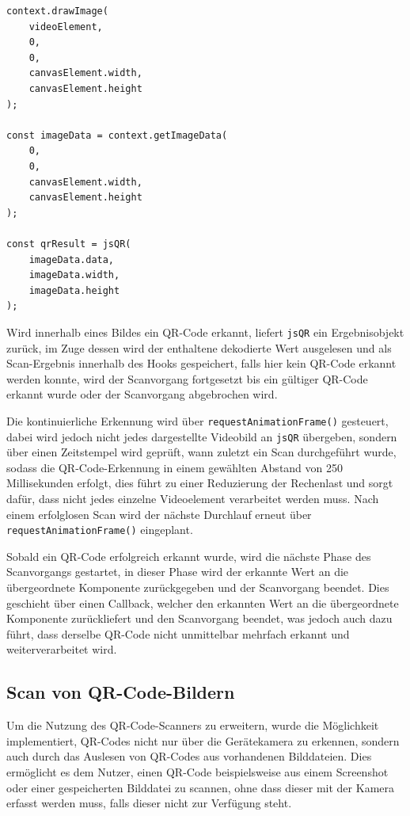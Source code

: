 ﻿\documentclass[oneside]{ausarbeitung}
\begin{document}
\begin{verbatim}
context.drawImage(
    videoElement,
    0,
    0,
    canvasElement.width,
    canvasElement.height
);

const imageData = context.getImageData(
    0,
    0,
    canvasElement.width,
    canvasElement.height
);

const qrResult = jsQR(
    imageData.data,
    imageData.width,
    imageData.height
);
\end{verbatim}


Wird innerhalb eines Bildes ein QR-Code erkannt, liefert \texttt{jsQR} ein Ergebnisobjekt zurück, im Zuge dessen wird der enthaltene dekodierte 
Wert ausgelesen und als Scan-Ergebnis innerhalb des Hooks gespeichert, falls hier kein QR-Code erkannt werden konnte, wird der Scanvorgang 
fortgesetzt bis ein gültiger QR-Code erkannt wurde oder der Scanvorgang abgebrochen wird.

Die kontinuierliche Erkennung wird über \texttt{requestAnimationFrame()} gesteuert, dabei wird jedoch nicht jedes dargestellte Videobild
an \texttt{jsQR} übergeben, sondern über einen Zeitstempel wird geprüft, wann zuletzt ein Scan durchgeführt wurde, sodass die QR-Code-Erkennung 
in einem gewählten Abstand von 250 Millisekunden erfolgt, dies führt zu einer Reduzierung der Rechenlast und sorgt dafür, dass nicht jedes einzelne
Videoelement verarbeitet werden muss. Nach einem erfolglosen Scan wird der nächste Durchlauf erneut über \texttt{requestAnimationFrame()} eingeplant.

Sobald ein QR-Code erfolgreich erkannt wurde, wird die nächste Phase des Scanvorgangs gestartet, in dieser Phase wird der erkannte Wert an die
übergeordnete Komponente zurückgegeben und der Scanvorgang beendet. Dies geschieht über einen Callback, welcher den erkannten Wert an die
übergeordnete Komponente zurückliefert und den Scanvorgang beendet, was jedoch auch dazu führt, dass derselbe QR-Code nicht unmittelbar mehrfach
erkannt und weiterverarbeitet wird.


\subsection{Scan von QR-Code-Bildern}
\label{sec:qr-bilddateien}

Um die Nutzung des QR-Code-Scanners zu erweitern, wurde die Möglichkeit implementiert, QR-Codes nicht nur über die Gerätekamera zu erkennen, 
sondern auch durch das Auslesen von QR-Codes aus vorhandenen Bilddateien. Dies ermöglicht es dem Nutzer, einen QR-Code beispielsweise aus
einem Screenshot oder einer gespeicherten Bilddatei zu scannen, ohne dass dieser mit der Kamera erfasst werden muss, falls dieser nicht
zur Verfügung steht.
\end{document}
